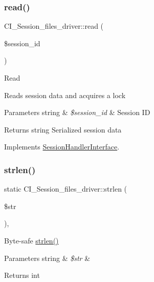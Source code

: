 \subsubsection{\texorpdfstring{read()}{read()}}
{\footnotesize\ttfamily C\+I\+\_\+\+Session\+\_\+files\+\_\+driver\+::read (\begin{DoxyParamCaption}\item[{}]{\$session\+\_\+id }\end{DoxyParamCaption})}

Read

Reads session data and acquires a lock


\begin{DoxyParams}[1]{Parameters}
string & {\em \$session\+\_\+id} & Session ID \\
\hline
\end{DoxyParams}
\begin{DoxyReturn}{Returns}
string Serialized session data 
\end{DoxyReturn}


Implements \mbox{\hyperlink{interface_session_handler_interface}{Session\+Handler\+Interface}}.

\mbox{\label{class_c_i___session__files__driver_afe8dce6fe07c01571d9b02da4c388ec5}} 
\subsubsection{\texorpdfstring{strlen()}{strlen()}}
{\footnotesize\ttfamily static C\+I\+\_\+\+Session\+\_\+files\+\_\+driver\+::strlen (\begin{DoxyParamCaption}\item[{}]{\$str }\end{DoxyParamCaption})\hspace{0.3cm}{\ttfamily [static]}, {\ttfamily [protected]}}

Byte-\/safe \mbox{\hyperlink{class_c_i___session__files__driver_afe8dce6fe07c01571d9b02da4c388ec5}{strlen()}}


\begin{DoxyParams}[1]{Parameters}
string & {\em \$str} & \\
\hline
\end{DoxyParams}
\begin{DoxyReturn}{Returns}
int 
\end{DoxyReturn}
\mbox{\label{class_c_i___session__files__driver_af046844374c973dc5f414ac2ad301dd3}} 
